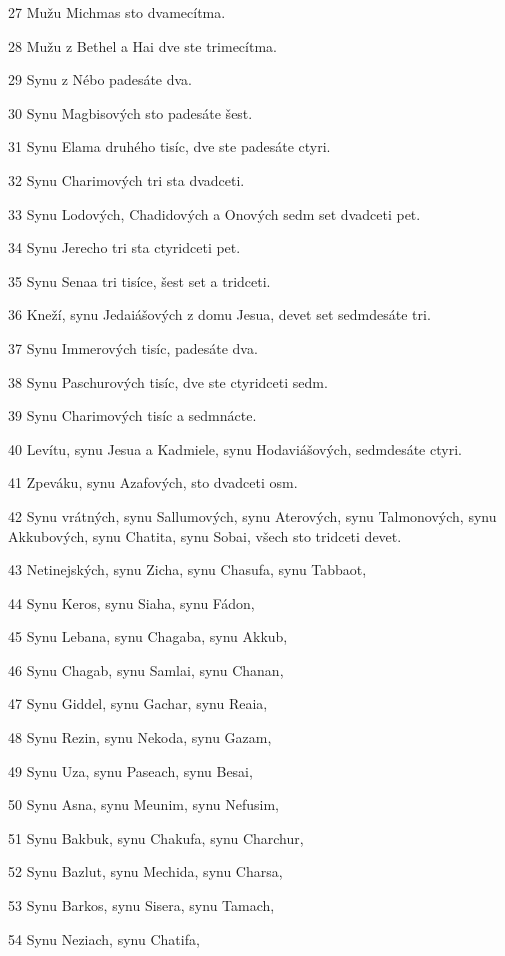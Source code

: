 \par 27 Mužu Michmas sto dvamecítma.
\par 28 Mužu z Bethel a Hai dve ste trimecítma.
\par 29 Synu z Nébo padesáte dva.
\par 30 Synu Magbisových sto padesáte šest.
\par 31 Synu Elama druhého tisíc, dve ste padesáte ctyri.
\par 32 Synu Charimových tri sta dvadceti.
\par 33 Synu Lodových, Chadidových a Onových sedm set dvadceti pet.
\par 34 Synu Jerecho tri sta ctyridceti pet.
\par 35 Synu Senaa tri tisíce, šest set a tridceti.
\par 36 Kneží, synu Jedaiášových z domu Jesua, devet set sedmdesáte tri.
\par 37 Synu Immerových tisíc, padesáte dva.
\par 38 Synu Paschurových tisíc, dve ste ctyridceti sedm.
\par 39 Synu Charimových tisíc a sedmnácte.
\par 40 Levítu, synu Jesua a Kadmiele, synu Hodaviášových, sedmdesáte ctyri.
\par 41 Zpeváku, synu Azafových, sto dvadceti osm.
\par 42 Synu vrátných, synu Sallumových, synu Aterových, synu Talmonových, synu Akkubových, synu Chatita, synu Sobai, všech sto tridceti devet.
\par 43 Netinejských, synu Zicha, synu Chasufa, synu Tabbaot,
\par 44 Synu Keros, synu Siaha, synu Fádon,
\par 45 Synu Lebana, synu Chagaba, synu Akkub,
\par 46 Synu Chagab, synu Samlai, synu Chanan,
\par 47 Synu Giddel, synu Gachar, synu Reaia,
\par 48 Synu Rezin, synu Nekoda, synu Gazam,
\par 49 Synu Uza, synu Paseach, synu Besai,
\par 50 Synu Asna, synu Meunim, synu Nefusim,
\par 51 Synu Bakbuk, synu Chakufa, synu Charchur,
\par 52 Synu Bazlut, synu Mechida, synu Charsa,
\par 53 Synu Barkos, synu Sisera, synu Tamach,
\par 54 Synu Neziach, synu Chatifa,
